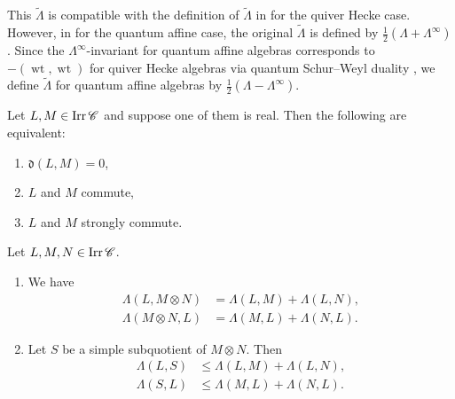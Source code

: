 \begin{Rem}
\label{Rem : convention for tilde Lambda}
This $\widetilde{\Lambda}$ is compatible with the definition
of $\widetilde{\Lambda}$ in \cite[Definition 3.1.1]{KKKO18}
for the quiver Hecke case.
However, in \cite[Definition 3.6]{KKOP20}
for the quantum affine case,
the original $\widetilde{\Lambda}$ is defined by
$\frac{1}{2}(\Lambda + \Lambda^{\infty})$.
Since the $\Lambda^{\infty}$-invariant for quantum affine algebras
corresponds to $-(\operatorname{wt}, \operatorname{wt})$
for quiver Hecke algebras via quantum Schur--Weyl duality
\cite[Theorem 4.12]{PBW24},
we define $\widetilde{\Lambda}$ for quantum affine algebras by
$\frac{1}{2}(\Lambda - \Lambda^{\infty})$.
\end{Rem}

\begin{Prop}
\label{Prop : d vanishing and commutativity}
Let $L, M \in \mathop{\mathrm{Irr}}\nolimits\mathscr{C}$ and suppose one of them is real.
Then the following are equivalent:
\begin{enumerate}
    \item[(i)] $\mathfrak{d}(L, M) = 0$,
    \item[(ii)] $L$ and $M$ commute,
    \item[(iii)] $L$ and $M$ strongly commute.
\end{enumerate}
\end{Prop}

\begin{Lem}
\label{Lem : Lambda tensor products and subquotients}
Let $L, M, N \in \mathop{\mathrm{Irr}}\nolimits\mathscr{C}$.
\begin{enumerate}
    \item[(i)] We have
    \[
    \begin{aligned}
    \Lambda(L, M \otimes N) &= \Lambda(L, M) + \Lambda(L, N), \\
    \Lambda(M \otimes N, L) &= \Lambda(M, L) + \Lambda(N, L).
    \end{aligned}
    \]
    \item[(ii)] Let $S$ be a simple subquotient of $M \otimes N$.
    Then
    \[
    \begin{aligned}
    \Lambda(L, S) &\leq \Lambda(L, M) + \Lambda(L, N), \\
    \Lambda(S, L) &\leq \Lambda(M, L) + \Lambda(N, L).
    \end{aligned}
    \]
\end{enumerate}
\end{Lem}

